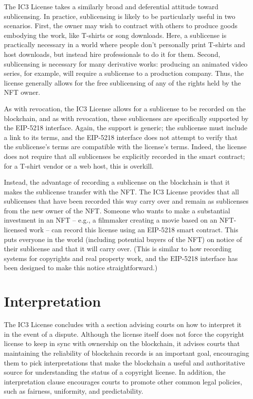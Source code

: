 \documentclass{article}
\newcommand{\eiplicense}{EIP-5218\xspace}
\begin{document}
The IC3 License takes a similarly broad and deferential attitude toward sublicensing. In practice, sublicensing is likely to be particularly useful in two scenarios. First, the owner may wish to contract with others to produce goods embodying the work, like T-shirts or song downloads. Here, a sublicense is practically necessary in a world where people don't personally print T-shirts and host downloads, but instead hire professionals to do it for them. Second, sublicensing is necessary for many derivative works: producing an animated video series, for example, will require a sublicense to a production company. Thus, the license generally allows for the free sublicensing of any of the rights held by the NFT owner.

As with revocation, the IC3 License allows for a sublicense to be recorded on the blockchain, and as with revocation, these sublicenses are specifically supported by the \eiplicense interface. Again, the support is generic; the sublicense must include a link to its terms, and the \eiplicense interface does not attempt to verify that the sublicense's terms are compatible with the license's terms. Indeed, the license does not require that all sublicenses be explicitly recorded in the smart contract; for a T-shirt vendor or a web host, this is overkill. 

Instead, the advantage of recording a sublicense on the blockchain is that it makes the sublicense transfer with the NFT. The IC3 License provides that all sublicenses that have been recorded this way carry over and remain as sublicenses from the new owner of the NFT. Someone who wants to make a substantial investment in an NFT -- e.g., a filmmaker creating a movie based on an NFT-licensed work -- can record this license using an \eiplicense smart contract. This puts everyone in the world (including potential buyers of the NFT) on notice of their sublicense and that it will carry over. (This is similar to how recording systems for copyrights and real property work, and the \eiplicense interface has been designed to make this notice straightforward.)   


\section{Interpretation}

The IC3 License concludes with a section advising courts on how to interpret it in the event of a dispute. Although the license itself does not force the copyright license to keep in sync with ownership on the blockchain, it advises courts that maintaining the reliability of blockchain records is an important goal, encouraging them to pick interpretations that make the blockchain a useful and authoritative source for understanding the status of a copyright license. In addition, the interpretation clause encourages courts to promote other common legal policies, such as fairness, uniformity, and predictability.
\end{document}
